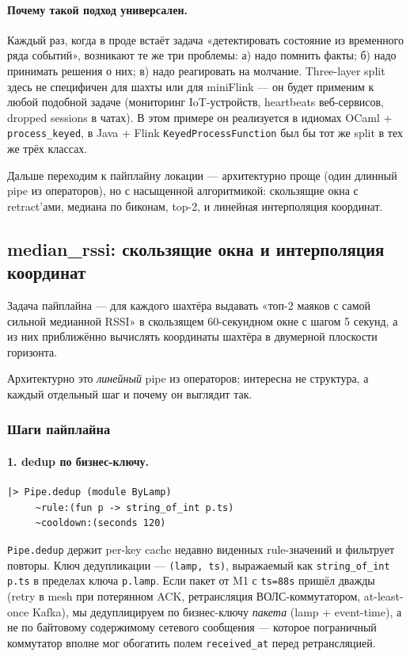 \paragraph{Почему такой подход универсален.} Каждый раз, когда в
проде встаёт задача «детектировать состояние из временного ряда
событий», возникают те же три проблемы:
а) надо помнить факты;
б) надо принимать решения о них;
в) надо реагировать на молчание.
Three-layer split здесь не специфичен для шахты или для miniFlink ---
он будет применим к любой подобной задаче (мониторинг IoT-устройств,
heartbeats веб-сервисов, dropped sessions в чатах). В этом примере
он реализуется в идиомах OCaml + \texttt{process\_keyed}, в Java
+ Flink \texttt{KeyedProcessFunction} был бы тот же split в тех
же трёх классах.

\medskip

Дальше переходим к пайплайну локации --- архитектурно проще
(один длинный pipe из операторов), но с насыщенной алгоритмикой:
скользящие окна с retract'ами, медиана по биконам, top-2, и
линейная интерполяция координат.

\subsection{median\_rssi: скользящие окна и интерполяция координат}\label{ssec:median}

Задача пайплайна --- для каждого шахтёра выдавать «топ-2 маяков с
самой сильной медианной RSSI» в скользящем 60-секундном окне с
шагом 5 секунд, а из них приближённо вычислять координаты шахтёра в
двумерной плоскости горизонта.

Архитектурно это \emph{линейный} pipe из операторов; интересна не
структура, а каждый отдельный шаг и почему он выглядит так.

\subsubsection{Шаги пайплайна}

\paragraph{1. dedup по бизнес-ключу.}
\begin{lstlisting}
|> Pipe.dedup (module ByLamp)
     ~rule:(fun p -> string_of_int p.ts)
     ~cooldown:(seconds 120)
\end{lstlisting}

\texttt{Pipe.dedup} держит per-key cache недавно виденных rule-значений
и фильтрует повторы. Ключ дедупликации --- \texttt{(lamp, ts)},
выражаемый как \texttt{string\_of\_int p.ts} в пределах ключа
\texttt{p.lamp}. Если пакет от M1 с \texttt{ts=88s} пришёл дважды
(retry в mesh при потерянном ACK, ретрансляция ВОЛС-коммутатором,
at-least-once Kafka), мы дедуплицируем по бизнес-ключу
\emph{пакета} (lamp + event-time), а не по байтовому содержимому
сетевого сообщения --- которое пограничный коммутатор вполне мог
обогатить полем \texttt{received\_at} перед ретрансляцией.

